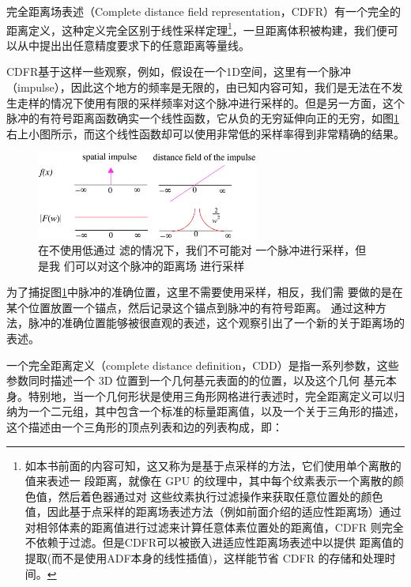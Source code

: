 完全距离场表述（Complete distance field representation，CDFR）\cite{a:A-Complete-Distance-Field-Representation}有一个完全的距离定义，这种定义完全区别于线性采样定理\footnote{如本书前面的内容可知，这又称为是基于点采样的方法，它们使用单个离散的值来表述一 段距离，就像在 GPU 的纹理中，其中每个纹素表示一个离散的颜色值，然后着色器通过对 这些纹素执行过滤操作来获取任意位置处的颜色值，因此基于点采样的距离场表述方法（例如前面介绍的适应性距离场）通过对相邻体素的距离值进行过滤来计算任意体素位置处的距离值，CDFR 则完全不依赖于过滤。但是CDFR可以被嵌入进适应性距离场表述中以提供 距离值的提取(而不是使用ADF本身的线性插值)，这样能节省 CDFR 的存储和处理时间。}，一旦距离体积被构建，我们便可以从中提出出任意精度要求下的任意距离等量线。

CDFR基于这样一些观察，例如，假设在一个1D空间，这里有一个脉冲（impulse），因此这个地方的频率是无限的，由已知内容可知，我们是无法在不发生走样的情况下使用有限的采样频率对这个脉冲进行采样的。但是另一方面，这个脉冲的有符号距离函数确实一个线性函数，它从负的无穷延伸向正的无穷，如图\ref{f:df-1-dimension-space}右上小图所示，而这个线性函数却可以使用非常低的采样率得到非常精确的结果。

\begin{figure}
	\sidecaption
	\includegraphics[width=0.65\textwidth]{figures/df/1-dimension-space}
	\caption{在不使用低通过 滤的情况下，我们不可能对 一个脉冲进行采样，但是我 们可以对这个脉冲的距离场 进行采样}
	\label{f:df-1-dimension-space}
\end{figure}

为了捕捉图\ref{f:df-1-dimension-space}中脉冲的准确位置，这里不需要使用采样，相反，我们需 要做的是在某个位置放置一个锚点，然后记录这个锚点到脉冲的有符号距离。 通过这种方法，脉冲的准确位置能够被很直观的表述，这个观察引出了一个新的关于距离场的表述。

一个完全距离定义（complete distance definition，CDD）是指一系列参数，这些参数同时描述一个 3D 位置到一个几何基元表面的的位置，以及这个几何 基元本身。特别地，当一个几何形状是使用三角形网格进行表述时，完全距离定义可以归纳为一个二元组，其中包含一个标准的标量距离值，以及一个关于三角形的描述，这个描述由一个三角形的顶点列表和边的列表构成，即：

